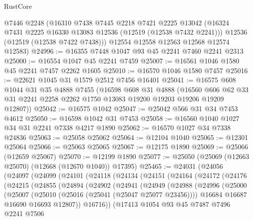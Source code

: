 \begin{lexlean}{RustCore}
\begin{coremodule}
      @7446
      @2248
      (@16310
        @7438
        @7445
        @2218
        @7421
        @2225
        @13042
        (@16324 @7431 @2225 @16330 @13083 @12536 (@12519 (@12538 @7432 @2241)))
        @12536
        (@12519 (@12538 @7422 @7438)))
      @12554
      @12558
      @12563
      @12568
      @12574
      @12583)
@24996 := @16355 @7448 @1047 @93 @45 @2241 @7460 @2241 @2313
@25000 := @16554 @1047 @45 @2241 @7459
@25007 := @16561 @1046 @1580 @45 @2241 @7457 @2262 @1605
@25010 := @16570 @1046 @1580 @7457
@25016 := @22621 @1045 @31 @1579 @2512 @7456 @16401
@25041 := @16575
    @608
    @1044
    @31
    @35
    @4888
    @7455
    (@16598
      @608
      @31
      @4888
      (@16560 @606 @62 @33 @31 @2241 @2258 @2262 @1750 @13083 @19200 @19203 @19206 @19209 @12807))
@25042 := @16575 @1042
@25047 := @25042 @566 @31 @34 @7453 @4612
@25050 := @16598 @1042 @31 @7453
@25058 := @16560 @1040 @1027 @34 @31 @2241 @7338 @4217 @1890
@25062 := @16570 @1027 @34 @7338 @24836
@25063 := @25058 @25062
@25064 := @12104 @1040
@25065 := @12301 @25064
@25066 := @25063 @25065
@25067 := @12175 @1890
@25069 := @25066 (@12659 @25067)
@25070 := @12199 @1890
@25077 := @25050 (@25069 (@12663 @25070) (@12668 (@12670 @1040)) @17395)
@25465 := @24031
    (@24056
      (@24097
        (@24099
          (@24101
            (@24118
              (@24134
                (@24151
                  (@24164
                    (@24172
                      (@24176
                        (@24215
                          (@24855
                            (@24894
                              (@24902
                                (@24941
                                  (@24949
                                    (@24988
                                      (@24996
                                        (@25000
                                          (@25007
                                            (@25010 (@25016 (@25041 (@25047 @25077 @23456))))
                                            @16684
                                            @16687
                                            @16690
                                            @16693
                                            @12807))
                                        @16716))
                                    (@17413
                                      @1054
                                      @93
                                      @45
                                      @7487
                                      @7496
                                      @2241
                                      @7506

\end{coremodule}
\end{lexlean}
